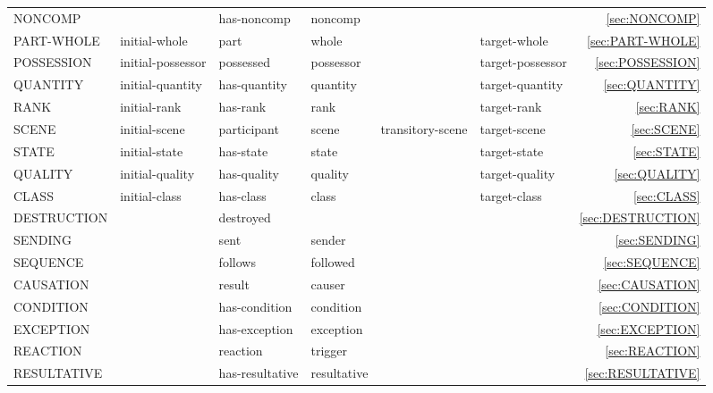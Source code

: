 \documentclass[a4paper]{article}
\newcommand{\fr}[1]{\textsf{#1}}
\newcommand{\rl}[1]{\textsf{#1}}
\newcommand{\Sub}{\textnoto{└} }
\newcommand{\SubSub}{\textcolor{white}{\Sub}\Sub}
\newcommand{\SubSubSub}{\textcolor{white}{\Sub}\SubSub}
\begin{document}
\begin{table}
{\begin{NiceTabular}{llllllr}
            \Sub{} \fr{NONCOMP} & & \rl{has-noncomp} & \rl{noncomp} & & & \ref{sec:NONCOMP} \\

            \Sub{} \fr{PART-WHOLE} & \rl{initial-whole} & \rl{part} & \rl{whole} & & \rl{target-whole} & \ref{sec:PART-WHOLE} \\

            \Sub{} \fr{POSSESSION} & \rl{initial-possessor} & \rl{possessed} & \rl{possessor} & & \rl{target-possessor} & \ref{sec:POSSESSION} \\

            \Sub{} \fr{QUANTITY} & \rl{initial-quantity} & \rl{has-quantity} & \rl{quantity} & & \rl{target-quantity} & \ref{sec:QUANTITY} \\

            \Sub{} \fr{RANK} & \rl{initial-rank} & \rl{has-rank} & \rl{rank} & & \rl{target-rank} & \ref{sec:RANK} \\

            \Sub{} \fr{SCENE} & \rl{initial-scene} & \rl{participant} & \rl{scene} & \rl{transitory-scene} & \rl{target-scene} & \ref{sec:SCENE} \\

            \Sub{} \fr{STATE} & \rl{initial-state} & \rl{has-state} & \rl{state} & & \rl{target-state} & \ref{sec:STATE} \\
            \SubSub{} \fr{QUALITY} & \rl{initial-quality}& \rl{has-quality} & \rl{quality} & & \rl{target-quality} & \ref{sec:QUALITY} \\
            \SubSubSub{} \fr{CLASS} & \rl{initial-class} & \rl{has-class} & \rl{class} & & \rl{target-class} & \ref{sec:CLASS} \\
            \SubSub{} \fr{DESTRUCTION} & & \rl{destroyed} & & & & \ref{sec:DESTRUCTION} \\

            \Sub{} \fr{SENDING} & & \rl{sent} & \rl{sender} & & & \ref{sec:SENDING} \\

            \Sub{} \fr{SEQUENCE} & & \rl{follows} & \rl{followed} & & & \ref{sec:SEQUENCE} \\
            \SubSub{} \fr{CAUSATION} & & \rl{result} & \rl{causer} & & & \ref{sec:CAUSATION} \\
            \SubSub{} \fr{CONDITION} & & \rl{has-condition} & \rl{condition} & & & \ref{sec:CONDITION} \\
            \SubSub{} \fr{EXCEPTION} & & \rl{has-exception} & \rl{exception} & & & \ref{sec:EXCEPTION} \\
            \SubSub{} \fr{REACTION} & & \rl{reaction} & \rl{trigger} & & & \ref{sec:REACTION} \\
            \SubSub{} \fr{RESULTATIVE} & & \rl{has-resultative} & \rl{resultative} & & & \ref{sec:RESULTATIVE} \\


\end{NiceTabular}}
\end{table}
\end{document}
